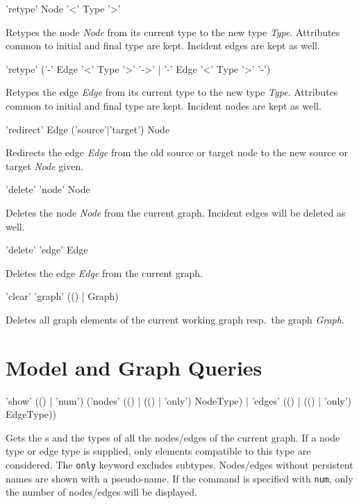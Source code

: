 \begin{rail}
  'retype' Node '<' Type '>'
\end{rail}
Retypes the node \emph{Node} from its current type to the new type \emph{Type}. Attributes common to initial and final type are kept. Incident edges are kept as well. 

\begin{rail}
  'retype' ('-' Edge '<' Type '>' '->' | '-' Edge '<' Type '>' '-')
\end{rail}
Retypes the edge \emph{Edge} from its current type to the new type \emph{Type}. Attributes common to initial and final type are kept. Incident nodes are kept as well.

\begin{rail}
  'redirect' Edge ('source'|'target') Node
\end{rail}
Redirects the edge \emph{Edge} from the old source or target node to the new source or target \emph{Node} given.

\begin{rail}
  'delete' 'node' Node
\end{rail}
Deletes the node \emph{Node} from the current graph.
Incident edges will be deleted as well.

\begin{rail}
  'delete' 'edge' Edge
\end{rail}
Deletes the edge \emph{Edge} from the current graph.

\begin{rail}
  'clear' 'graph' (() | Graph)
\end{rail}
Deletes all graph elements of the current working graph resp.\ the graph \emph{Graph}.


\section{Model and Graph Queries}

\begin{rail}
  'show' (() | 'num') ('nodes' (() | (() | 'only') NodeType) | 'edges' (() | (() | 'only') EdgeType))
\end{rail}
Gets the s and the types of all the nodes/edges of the current graph.
If a node type or edge type is supplied, only elements compatible to this type are considered.
The \texttt{only} keyword excludes subtypes. Nodes/edges without persistent names are shown with a pseudo-name.
If the command is specified with \texttt{num}, only the number of nodes/edges will be displayed.

